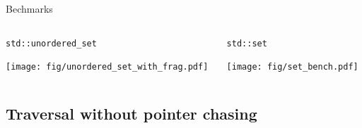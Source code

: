 \documentclass[10pt,aspectratio=169]{beamer}
\begin{document}
\begin{frame}{Bechmarks}
    \begin{columns}
        \begin{column}{0.5\textwidth}
            \texttt{std::unordered\_set}
            \begin{center}
                \texttt{[image: fig/unordered\_set\_with\_frag.pdf]} \\
            \end{center}
        \end{column}

        \begin{column}{0.5\textwidth}
            \texttt{std::set}
            \begin{center}
                \texttt{[image: fig/set\_bench.pdf]} \\
            \end{center}
        \end{column}
    \end{columns}
\end{frame}

\subsection{Traversal without pointer chasing}
\end{document}
